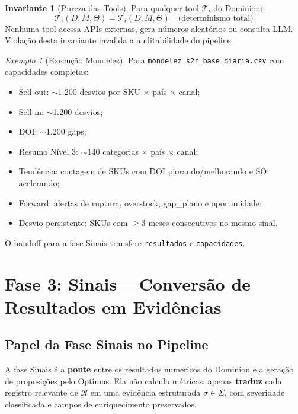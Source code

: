 \documentclass[a4paper, 12pt]{report}
\theoremstyle{definition}
\newtheorem{invariante}{Invariante}[chapter]
\theoremstyle{remark}
\newtheorem{exemplo}{Exemplo}[chapter]
\newcommand{\tool}{\mathcal{T}}
\begin{document}
\begin{invariante}[Pureza das Tools]
  Para qualquer tool $\tool_i$ do Dominion:
  \[
    \tool_i(D, M, \Theta) = \tool_i(D, M, \Theta)
    \quad \text{(determinismo total)}
  \]
  Nenhuma tool acessa APIs externas, gera n\'umeros aleat\'orios
  ou consulta LLM. Viola\c{c}\~ao desta invariante invalida a auditabilidade
  do pipeline.
\end{invariante}

\begin{exemplo}[Execu\c{c}\~ao Mondelez]
  Para \texttt{mondelez\_s2r\_base\_diaria.csv} com capacidades completas:
  \begin{itemize}
    \item Sell-out: $\sim$1.200 desvios por SKU $\times$ pa\'is $\times$ canal;
    \item Sell-in: $\sim$1.200 desvios;
    \item DOI: $\sim$1.200 gaps;
    \item Resumo N\'ivel 3: $\sim$140 categorias $\times$ pa\'is $\times$ canal;
    \item Tend\^encia: contagem de SKUs com DOI piorando/melhorando e SO acelerando;
    \item Forward: alertas de ruptura, overstock, gap\_plano e oportunidade;
    \item Desvio persistente: SKUs com $\geq 3$ meses consecutivos no mesmo sinal.
  \end{itemize}
  O handoff para a fase Sinais transfere \texttt{resultados} e \texttt{capacidades}.
\end{exemplo}


\chapter{Fase 3: Sinais -- Convers\~ao de Resultados em Evid\^encias}

\section{Papel da Fase Sinais no Pipeline}

A fase Sinais \'e a \textbf{ponte} entre os resultados num\'ericos do Dominion
e a gera\c{c}\~ao de proposi\c{c}\~oes pelo Optimus. Ela n\~ao calcula m\'etricas:
apenas \textbf{traduz} cada registro relevante de $\mathcal{R}$ em uma
evid\^encia estruturada $\sigma \in \Sigma$, com severidade classificada
e campos de enriquecimento preservados.
\end{document}
